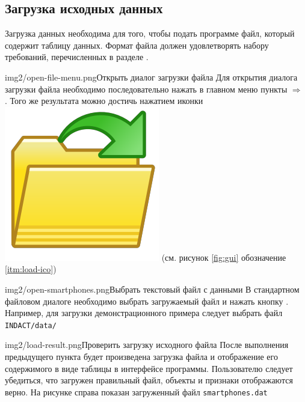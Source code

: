\documentclass[12pt,tikz]{instruction}
\begin{document}
\newpage
\subsection{Загрузка исходных данных}
\label{subsec:dataload}

Загрузка данных необходима для того, чтобы подать программе файл, который содержит таблицу данных. Формат файла должен удовлетворять набору требований, перечисленных в разделе . 

\begin{steps}
	\begin{ist}{img2/open-file-menu.png}{Открыть диалог загрузки файла}
		Для открытия диалога загрузки файла необходимо последовательно нажать в главном меню пункты  $ \Rightarrow $ . Того же результата можно достичь нажатием иконки \includegraphics[scale=0.05]{img2/folder-ico.png} (см. рисунок \ref{fig:gui} обозначение \ref{itm:load-ico})
	\end{ist}
	
	\begin{ist}{img2/open-smartphones.png}{Выбрать текстовый файл с данными}
		В стандартном файловом диалоге необходимо выбрать загружаемый файл и нажать кнопку . Например, для загрузки демонстрационного примера следует выбрать файл \texttt{INDACT/data/} \SampleFile 
	\end{ist}
	\begin{ist}{img2/load-result.png}{Проверить загрузку исходного файла}
		После выполнения предыдущего пункта будет произведена загрузка файла и отображение его содержимого в виде таблицы в интерфейсе программы. Пользователю следует убедиться, что загружен правильный файл, объекты и признаки отображаются верно. На рисунке справа показан загруженный файл \texttt{smartphones.dat} 
	\end{ist}
\end{steps}
\end{document}
